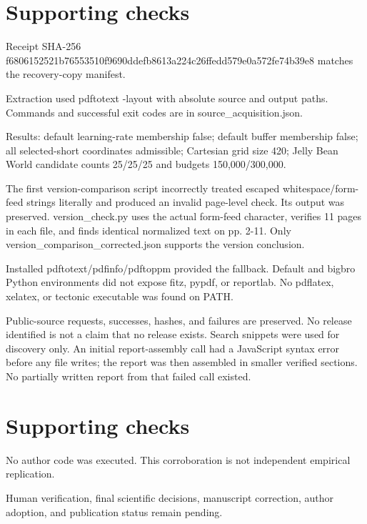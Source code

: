 \documentclass[10pt]{article}
\begin{document}
\section*{Supporting checks}
Receipt SHA-256 f6806152521b76553510f9690ddefb8613a224c26ffedd579e0a572fe74b39e8 matches the recovery-copy manifest.\par
Extraction used pdftotext -layout with absolute source and output paths. Commands and successful exit codes are in source\_acquisition.json.\par
Results: default learning-rate membership false; default buffer membership false; all selected-short coordinates admissible; Cartesian grid size 420; Jelly Bean World candidate counts 25/25/25 and budgets 150,000/300,000.\par
The first version-comparison script incorrectly treated escaped whitespace/form-feed strings literally and produced an invalid page-level check. Its output was preserved. version\_check.py uses the actual form-feed character, verifies 11 pages in each file, and finds identical normalized text on pp. 2-11. Only version\_comparison\_corrected.json supports the version conclusion.\par
Installed pdftotext/pdfinfo/pdftoppm provided the fallback. Default and bigbro Python environments did not expose fitz, pypdf, or reportlab. No pdflatex, xelatex, or tectonic executable was found on PATH.\par
Public-source requests, successes, hashes, and failures are preserved. No release identified is not a claim that no release exists. Search snippets were used for discovery only. An initial report-assembly call had a JavaScript syntax error before any file writes; the report was then assembled in smaller verified sections. No partially written report from that failed call existed.\par
\section*{Supporting checks}
No author code was executed. This corroboration is not independent empirical replication.\par
Human verification, final scientific decisions, manuscript correction, author adoption, and publication status remain pending.\par
\end{document}

